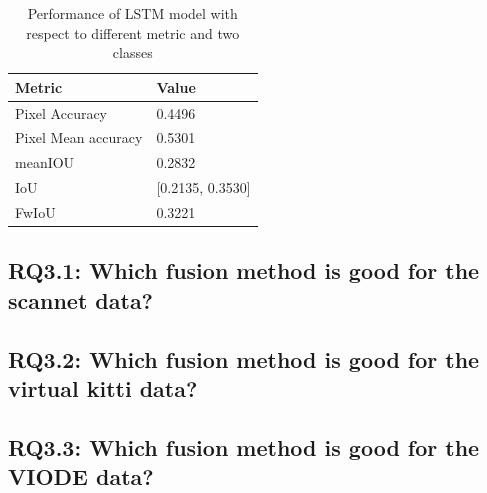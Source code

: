 	\begin{table}
	\begin{center}
		\begin{tabular}{ | l | p{12cm} |}
			\hline
			
			\cellcolor{purple!30}Metric & \cellcolor{purple!30}Value \\ \hline
			Pixel Accuracy & 0.4496 \\ \hline
			Pixel Mean accuracy & 0.5301  \\ \hline
			meanIOU & 0.2832 \\ \hline
			IoU & [0.2135, 0.3530] \\ \hline
			FwIoU & 0.3221 \\ \hline
			\hline
		\end{tabular}
		\caption{Performance of LSTM model with respect to different metric and two classes}
		\label{table:LSTM_conti_seq}
	\end{center}
	\end{table}
	
    \subsection{RQ3.1: Which fusion method is good for the scannet data?}
    \subsection{RQ3.2: Which fusion method is good for the virtual kitti data?}
    \subsection{RQ3.3: Which fusion method is good for the VIODE data?}
    

